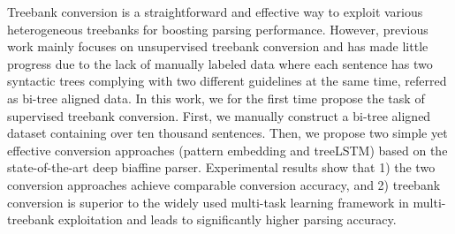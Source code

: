 Treebank conversion is a straightforward and effective way to exploit various heterogeneous treebanks for boosting parsing performance. However, previous work mainly focuses on unsupervised treebank conversion and has made little progress due to the lack of manually labeled data where each sentence has two syntactic trees complying with two different guidelines at the same time, referred as bi-tree aligned data. In this work, we for the first time propose the task of supervised treebank conversion. First, we manually construct a bi-tree aligned dataset containing over ten thousand sentences. Then, we propose two simple yet effective conversion approaches (pattern embedding and treeLSTM) based on the state-of-the-art deep biaffine parser. Experimental results show that 1) the two conversion approaches achieve comparable conversion accuracy, and 2) treebank conversion is  superior to the widely used multi-task learning framework in multi-treebank exploitation and leads to significantly higher parsing accuracy.

